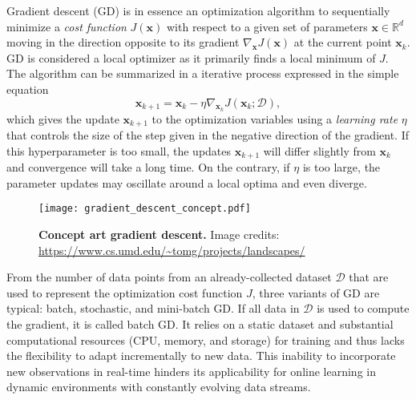 Gradient descent (GD) is in essence an optimization algorithm to sequentially minimize a \emph{cost function} $J(\bm{x})$ with respect to a given set of parameters $\bm{x} \in \mathbb{R}^d$ moving in the direction opposite to its gradient $\nabla_{\bm{x}}J(\bm{x})$ at the current point $\bm{x}_k$. GD is considered a local optimizer as it primarily finds a local minimum of $J$. The algorithm can be summarized in a iterative process expressed in the simple equation
\begin{equation}\label{eq:gradient_descent}
	\bm{x}_{k+1} = \bm{x}_k - \eta  \nabla_{\bm{x}_k} J(\bm{x}_k;\mathcal{D}),
\end{equation}  
which gives the update $\bm{x}_{k+1}$ to the optimization variables using a \emph{learning rate} $\eta$ that controls the size of the step given in the negative direction of the gradient. If this hyperparameter is too small, the updates $\bm{x}_{k+1}$ will differ slightly from $\bm{x}_k$ and convergence will take a long time. On the contrary, if $\eta$ is too large, the parameter updates may oscillate around a local optima and even diverge. 
\begin{figure*}[t!]
	\begin{center}
		\texttt{[image: gradient\_descent\_concept.pdf]}
	\end{center}
	\caption{\textbf{Concept art gradient descent.} Image credits: \url{https://www.cs.umd.edu/~tomg/projects/landscapes/}}
\end{figure*}
From the number of data points from an already-collected dataset $\mathcal{D}$ that are used to represent the optimization cost function $J$, three variants of GD are typical: batch, stochastic, and mini-batch GD. If all data in $\mathcal{D}$ is used to compute the gradient, it is called batch GD. It relies on a static dataset and substantial computational resources (CPU, memory, and storage) for training and thus lacks the flexibility to adapt incrementally to new data. This inability to incorporate new observations in real-time hinders its applicability for online learning in dynamic environments with constantly evolving data streams. 

